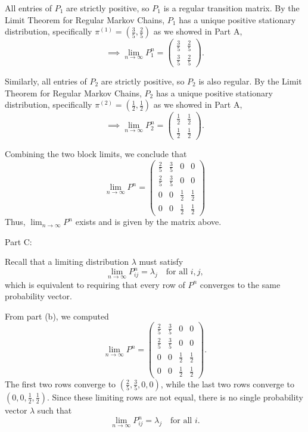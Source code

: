 \documentclass[hidelinks]{article}
\begin{document}
\medskip

\noindent All entries of $P_1$ are strictly positive, so $P_1$ is a regular transition
matrix. By the Limit Theorem for Regular Markov Chains, $P_1$ has a unique
positive stationary distribution, specifically $\pi^{(1)}=(\frac{3}{5},\frac{2}{5})$ as we showed in Part A,
\[
\implies
\lim_{n\to\infty} P_1^n
=
\begin{pmatrix}
\frac{3}{5} & \frac{2}{5}\\
\frac{3}{5} & \frac{2}{5}
\end{pmatrix}.
\]

\medskip

\noindent Similarly, all entries of $P_2$ are strictly positive, so $P_2$ is also regular.
By the Limit Theorem for Regular Markov Chains, $P_2$ has a unique positive
stationary distribution, specifically $\pi^{(2)}=(\frac{1}{2},\frac{1}{2})$ as we showed in Part A,
\[
\implies
\lim_{n\to\infty} P_2^n
=
\begin{pmatrix}
\frac{1}{2} & \frac{1}{2}\\
\frac{1}{2} & \frac{1}{2}
\end{pmatrix}.
\]

\noindent Combining the two block limits, we conclude that
\[
\lim_{n\to\infty}P^n
=
\begin{pmatrix}
\frac25 & \frac35 & 0 & 0\\[4pt]
\frac25 & \frac35 & 0 & 0\\[4pt]
0 & 0 & \frac12 & \frac12\\[4pt]
0 & 0 & \frac12 & \frac12
\end{pmatrix}
\]
Thus, $\lim_{n\to\infty}P^n$ exists and is given by the matrix above.

\medskip

\noindent Part C:

\noindent Recall that a limiting distribution $\lambda$ must satisfy
\[
\lim_{n\to\infty} P^n_{ij} = \lambda_j
\quad \text{for all } i,j,
\]
which is equivalent to requiring that every row of $P^n$ converges to the same
probability vector.

\noindent From part (b), we computed
\[
\lim_{n\to\infty} P^n
=
\begin{pmatrix}
\frac25 & \frac35 & 0 & 0\\[4pt]
\frac25 & \frac35 & 0 & 0\\[4pt]
0 & 0 & \frac12 & \frac12\\[4pt]
0 & 0 & \frac12 & \frac12
\end{pmatrix}.
\]
The first two rows converge to $(\frac25,\frac35,0,0)$, while the last two rows
converge to $(0,0,\frac12,\frac12)$. Since these limiting rows are not equal,
there is no single probability vector $\lambda$ such that
\[
\lim_{n\to\infty} P^n_{ij} = \lambda_j
\quad \text{for all } i.
\]
\end{document}
